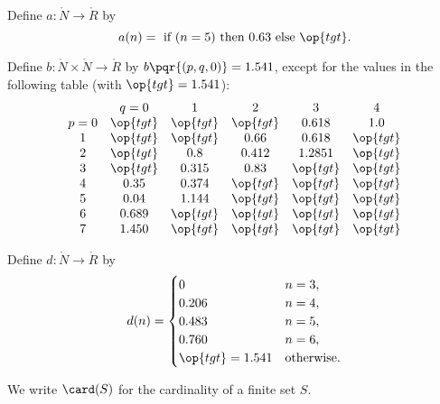 \begin{definition}[a]
  Define $a:\ring{N}\to \ring{R}$ by
  $$
  a(n) = \hbox{ if } (n=5) \hbox{ then } 0.63 \hbox{ else } \op{tgt}.
  $$
\end{definition}

\begin{definition}[b]
  Define $b:\ring{N}\times \ring{N}\to \ring{R}$ by $b\pqr{(p,q,0)}=1.541$,
  except for the values in the following table
  (with  $\op{tgt}=1.541$):
  {
  \def\tx{\op{tgt}}
  $$\begin{matrix}  &q=0&1&2&3&4\\
           p=0&\tx&\tx&\tx&0.618&1.0\\
           1&\tx&\tx&0.66&0.618&\tx\\
           2&\tx&0.8&0.412&1.2851&\tx\\
           3&\tx&0.315&0.83&\tx&\tx\\
           4&0.35&0.374&\tx&\tx&\tx\\
           5&0.04&1.144&\tx&\tx&\tx\\
           6&0.689&\tx&\tx&\tx&\tx\\
           7&1.450&\tx&\tx&\tx&\tx
   \end{matrix}
   $$
   }
\end{definition}


\begin{definition}[d]
    Define $d:\ring{N}\to \ring{R}$ by
  $$d(n) = \begin{cases}
    0 & n=3, \\
    0.206 & n=4, \\
    0.483 & n=5, \\
    0.760 & n=6, \\
    \op{tgt}=1.541 & \text{otherwise}.
  \end{cases}
  $$
\end{definition}


We write $\card(S)$ for the cardinality of a finite set $S$.


